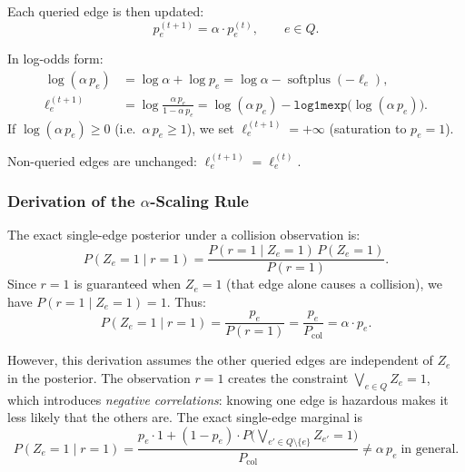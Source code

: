 \documentclass[11pt]{article}
\DeclareMathOperator{\softplus}{softplus}
\begin{document}
Each queried edge is then updated:
\begin{equation}
  p_e^{(t+1)} = \alpha \cdot p_e^{(t)}, \qquad e \in Q.
  \label{eq:alpha-scale}
\end{equation}

In log-odds form:
\begin{align}
  \log(\alpha\, p_e) &= \log\alpha + \log p_e
  = \log\alpha - \softplus(-\ell_e), \label{eq:log-alpha-p} \\[4pt]
  \ell_e^{(t+1)} &= \log\frac{\alpha\, p_e}{1 - \alpha\, p_e}
  = \log(\alpha\, p_e) - \texttt{log1mexp}\bigl(\log(\alpha\, p_e)\bigr).
  \label{eq:new-logodds}
\end{align}
If $\log(\alpha\, p_e) \geq 0$ (i.e.\ $\alpha\, p_e \geq 1$), we set
$\ell_e^{(t+1)} = +\infty$ (saturation to $p_e = 1$).

Non-queried edges are unchanged: $\ell_e^{(t+1)} = \ell_e^{(t)}$.

\subsubsection{Derivation of the $\alpha$-Scaling Rule}

The exact single-edge posterior under a collision observation is:
\begin{equation}
  P(Z_e = 1 \mid r{=}1)
  = \frac{P(r{=}1 \mid Z_e = 1)\, P(Z_e = 1)}{P(r{=}1)}.
  \label{eq:bayes-single}
\end{equation}
Since $r = 1$ is guaranteed when $Z_e = 1$ (that edge alone causes a
collision), we have $P(r{=}1 \mid Z_e = 1) = 1$.  Thus:
\begin{equation}
  P(Z_e = 1 \mid r{=}1)
  = \frac{p_e}{P(r{=}1)}
  = \frac{p_e}{P_{\text{col}}}
  = \alpha \cdot p_e.
  \label{eq:alpha-derivation}
\end{equation}

However, this derivation assumes the other queried edges are independent
of $Z_e$ in the posterior.  The observation $r = 1$ creates the
constraint $\bigvee_{e \in Q} Z_e = 1$, which introduces
\emph{negative correlations}: knowing one edge is hazardous makes it
less likely that the others are.  The exact single-edge marginal is
\begin{equation}
  P(Z_e = 1 \mid r{=}1)
  = \frac{p_e \cdot 1 + (1-p_e)\cdot P\bigl(\bigvee_{e' \in Q\setminus\{e\}} Z_{e'} = 1\bigr)}
         {P_{\text{col}}}
  \neq \alpha\, p_e \;\text{in general.}
\end{equation}
\end{document}
